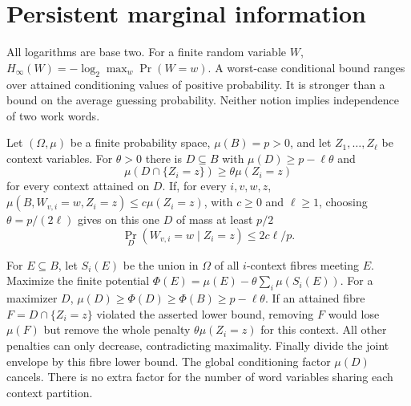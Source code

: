 \section{Persistent marginal information}\label{sec:persistence}

All logarithms are base two. For a finite random variable $W$,
$H_\infty(W)=-\log_2\max_w\Pr(W=w)$. A worst-case conditional bound
ranges over attained conditioning values of positive probability. It is
stronger than a bound on the average guessing probability. Neither notion
implies independence of two work words.

\begin{lemma}\label{lem:context-pruning}
Let $(\Omega,\mu)$ be a finite probability space, $\mu(B)=p>0$, and let $Z_1,\ldots,Z_\ell$
be context variables. For $\theta>0$ there is $D\subseteq B$ with
$\mu(D)\ge p-\ell\theta$ and
\[
 \mu(D\cap\{Z_i=z\})\ge\theta\mu(Z_i=z)
\]
for every context attained on $D$. If, for every $i,v,w,z$,
$\mu(B,W_{v,i}=w,Z_i=z)\le c\mu(Z_i=z)$, with $c\ge0$ and $\ell\ge1$, choosing
$\theta=p/(2\ell)$ gives on this one $D$ of mass at least $p/2$
\[
 \Pr_D(W_{v,i}=w\mid Z_i=z)\le 2c\ell/p.
\]
\end{lemma}
\begin{outline}
For $E\subseteq B$, let $S_i(E)$ be the union in $\Omega$ of all $i$-context
fibres meeting $E$. Maximize the finite potential
$\Phi(E)=\mu(E)-\theta\sum_i\mu(S_i(E))$. For a maximizer $D$,
$\mu(D)\ge\Phi(D)\ge\Phi(B)\ge p-\ell\theta$. If an attained fibre
$F=D\cap\{Z_i=z\}$ violated the asserted lower bound, removing $F$ would
lose $\mu(F)$ but remove the whole penalty $\theta\mu(Z_i=z)$ for this
context. All other penalties can only decrease, contradicting maximality.
Finally divide the joint envelope by this fibre lower bound. The global
conditioning factor $\mu(D)$ cancels. There is no extra factor for the
number of word variables sharing each context partition.
\end{outline}

